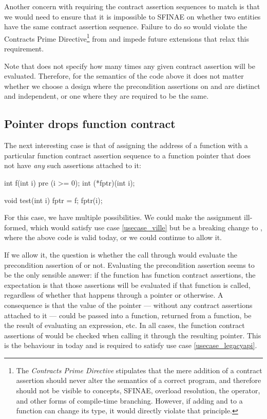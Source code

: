 Another concern with requiring the contract assertion sequences to match is that we would need to ensure that it is impossible to SFINAE on whether two entities have the same contract assertion sequence. Failure to do so would violate the Contracts Prime Directive\footnote{The \emph{Contracts Prime Directive} stipulates that the mere addition of a contract assertion should never alter the semantics of a correct program, and therefore should not be visible to concepts, SFINAE, overload resolution, the  operator, and other forms of compile-time branching. However, if adding  and  to a function can change its type, it would directly violate that principle.} from \cite{P2900R8} and impede future extensions that relax this requirement.

Note that \cite{P2900R8} does not specify how many times any given contract assertion will be evaluated. Therefore, for the semantics of the code above it does not matter whether we choose a design where the precondition assertions on  and  are distinct and independent, or one where they are required to be the same.


\subsection{Pointer drops function contract}
\label{dropping}

The next interesting case is that of assigning the address of a function with a particular function contract assertion sequence to a function pointer that does not have \emph{any} such assertions attached to it:
\begin{codeblock}
int f(int i) pre (i >= 0);
int (*fptr)(int i);

void test(int i) {
  fptr = f; 
  fptr(i); 
}
\end{codeblock}
For this case, we have multiple possibilities. We could make the assignment ill-formed, which would satisfy use case \ref{usecase_ville} but be a breaking change to \cite{P2900R8}, where the above code is valid today, or we could continue to allow it.

If we allow it, the question is whether the call through  would evaluate the precondition assertion of  or not. Evaluating the precondition assertion seems to be the only sensible answer: if the function  has function contract assertions, the expectation is that those assertions will be evaluated if that function is called, regardless of whether that happens through a pointer or otherwise. A consequence is that the value of the pointer  --- without any contract assertions attached to it --- could be passed into a function, returned from a function, be the result of evaluating an expression, etc. In all cases, the function contract assertions of  would be checked when calling it through the resulting pointer. This is the behaviour in \cite{P2900R8} today and is required to satisfy use case \ref{usecase_legacyapi}.

